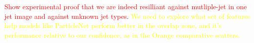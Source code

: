 \textcolor{red}{Show experimental proof that we are indeed resilliant against mutliple-jet in one jet image and against unknown jet types}.
\textcolor{yellow}{We need to explore what set of features help models like ParticleNet \cite{particle_net} perform better in the overlap zone, and it's performance relative to our confidence, as in the Orange comparative scatters.}